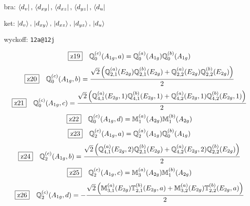 \documentclass[fleqn,10pt,landscape]{jsarticle}
\begin{document}
\noindent\quad * bra: $\bra{d_{v}},\, \bra{d_{xy}},\, \bra{d_{xz}},\, \bra{d_{yz}},\, \bra{d_{u}}$

\noindent\quad * ket: $\ket{d_{v}},\, \ket{d_{xy}},\, \ket{d_{xz}},\, \ket{d_{yz}},\, \ket{d_{u}}$

\noindent\quad * wyckoff: \texttt{12a@12j}

\begin{dmath*}
\hspace*{3mm}\fbox{z19}\quad \mathbb{Q}_{0}^{(c)}(A_{1g},a)=\mathbb{Q}_{0}^{(a)}(A_{1g}) \mathbb{Q}_{0}^{(b)}(A_{1g})
\end{dmath*}
\begin{dmath*}
\hspace*{3mm}\fbox{z20}\quad \mathbb{Q}_{0}^{(c)}(A_{1g},b)=\frac{\sqrt{2} \left(\mathbb{Q}_{2,1}^{(a)}(E_{2g}) \mathbb{Q}_{2,1}^{(b)}(E_{2g}) + \mathbb{Q}_{2,2}^{(a)}(E_{2g}) \mathbb{Q}_{2,2}^{(b)}(E_{2g})\right)}{2}
\end{dmath*}
\begin{dmath*}
\hspace*{3mm}\fbox{z21}\quad \mathbb{Q}_{0}^{(c)}(A_{1g},c)=\frac{\sqrt{2} \left(\mathbb{Q}_{4,1}^{(a)}(E_{2g},1) \mathbb{Q}_{4,1}^{(b)}(E_{2g},1) + \mathbb{Q}_{4,2}^{(a)}(E_{2g},1) \mathbb{Q}_{4,2}^{(b)}(E_{2g},1)\right)}{2}
\end{dmath*}
\begin{dmath*}
\hspace*{3mm}\fbox{z22}\quad \mathbb{Q}_{0}^{(c)}(A_{1g},d)=\mathbb{M}_{1}^{(a)}(A_{2g}) \mathbb{M}_{1}^{(b)}(A_{2g})
\end{dmath*}
\begin{dmath*}
\hspace*{3mm}\fbox{z23}\quad \mathbb{Q}_{2}^{(c)}(A_{1g},a)=\mathbb{Q}_{2}^{(a)}(A_{1g}) \mathbb{Q}_{0}^{(b)}(A_{1g})
\end{dmath*}
\begin{dmath*}
\hspace*{3mm}\fbox{z24}\quad \mathbb{Q}_{2}^{(c)}(A_{1g},b)=\frac{\sqrt{2} \left(\mathbb{Q}_{4,1}^{(a)}(E_{2g},2) \mathbb{Q}_{2,1}^{(b)}(E_{2g}) + \mathbb{Q}_{4,2}^{(a)}(E_{2g},2) \mathbb{Q}_{2,2}^{(b)}(E_{2g})\right)}{2}
\end{dmath*}
\begin{dmath*}
\hspace*{3mm}\fbox{z25}\quad \mathbb{Q}_{2}^{(c)}(A_{1g},c)=\mathbb{M}_{3}^{(a)}(A_{2g}) \mathbb{M}_{1}^{(b)}(A_{2g})
\end{dmath*}
\begin{dmath*}
\hspace*{3mm}\fbox{z26}\quad \mathbb{Q}_{2}^{(c)}(A_{1g},d)=- \frac{\sqrt{2} \left(\mathbb{M}_{3,1}^{(a)}(E_{2g}) \mathbb{T}_{2,1}^{(b)}(E_{2g},a) + \mathbb{M}_{3,2}^{(a)}(E_{2g}) \mathbb{T}_{2,2}^{(b)}(E_{2g},a)\right)}{2}
\end{dmath*}
\end{document}
